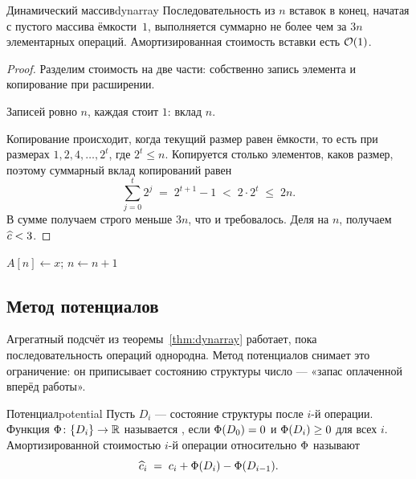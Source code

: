 \documentclass[../main.tex]{subfiles}
\begin{document}
\begin{Theorem}{Динамический массив}{dynarray}
  Последовательность из $n$ вставок в конец, начатая с пустого массива ёмкости~$1$,
  выполняется суммарно не более чем за $3n$ элементарных операций. Амортизированная
  стоимость вставки есть $\mathcal{O}(1)$.
\end{Theorem}

\begin{proof}
  Разделим стоимость на две части: собственно запись элемента и копирование при
  расширении.

  Записей ровно $n$, каждая стоит $1$: вклад $n$.

  Копирование происходит, когда текущий размер равен ёмкости, то есть при размерах
  $1, 2, 4, \dots, 2^{t}$, где $2^{t} \le n$. Копируется столько элементов, каков
  размер, поэтому суммарный вклад копирований равен
  \[
    \sum_{j=0}^{t} 2^{j} \;=\; 2^{t+1} - 1 \;<\; 2\cdot 2^{t} \;\le\; 2n .
  \]
  В сумме получаем строго меньше $3n$, что и требовалось. Деля на $n$, получаем
  $\widehat{c} < 3$.
\end{proof}

\begin{algorithm}[H]
  \caption{Вставка в конец динамического массива}
  \label{alg:pushback}
  $A[n] \gets x$; \quad $n \gets n+1$\;
\end{algorithm}

\subsection{Метод потенциалов}

Агрегатный подсчёт из теоремы~\ref{thm:dynarray} работает, пока последовательность
операций однородна. Метод потенциалов снимает это ограничение: он приписывает
состоянию структуры число --- «запас оплаченной вперёд работы».

\begin{Definition}{Потенциал}{potential}
  Пусть $D_i$ --- состояние структуры после $i$-й операции. Функция
  $\Phi\colon \{D_i\} \to \mathbb{R}$ называется , если
  $\Phi(D_0) = 0$ и $\Phi(D_i) \ge 0$ для всех $i$. Амортизированной стоимостью
  $i$-й операции относительно $\Phi$ называют
  \[
    \widehat{c}_i \;=\; c_i + \Phi(D_i) - \Phi(D_{i-1}).
  \]
\end{Definition}
\end{document}
